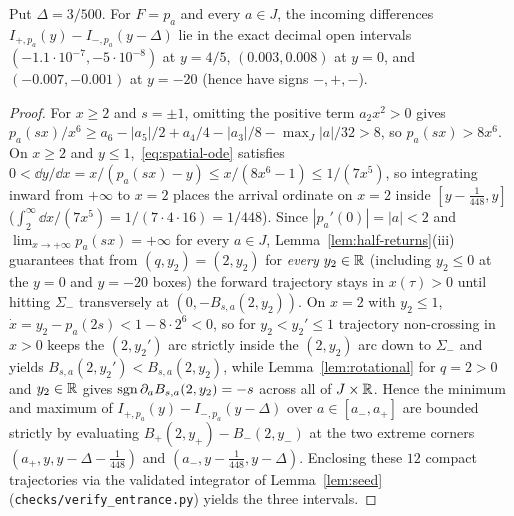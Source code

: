 \begin{lemma}\label{lem:seed-incoming}
Put $\Delta=3/500$. For $F=p_a$ and every $a\in J$, the incoming differences $I_{+,p_a}(y)-I_{-,p_a}(y-\Delta)$ lie in the exact decimal open intervals $(-1.1\cdot 10^{-7},-5\cdot 10^{-8})$ at $y=4/5$, $(0.003,0.008)$ at $y=0$, and $(-0.007,-0.001)$ at $y=-20$ (hence have signs $-,+,-$).
\end{lemma}

\begin{proof}
For $x\ge 2$ and $s=\pm 1$, omitting the positive term $a_2 x^2>0$ gives $p_a(sx)/x^6\ge a_6-|a_5|/2+a_4/4-|a_3|/8-\max_J|a|/32>8$, so $p_a(sx)>8x^6$. On $x\ge 2$ and $y\le 1$,~\eqref{eq:spatial-ode} satisfies $0<\dd y/\dd x=x/(p_a(sx)-y)\le x/(8x^6-1)\le 1/(7x^5)$, so integrating inward from $+\infty$ to $x=2$ places the arrival ordinate on $x=2$ inside $[y-\frac{1}{448},y]$ ($\int_2^\infty\dd x/(7x^5)=1/(7\cdot 4\cdot 16)=1/448$). Since $|p_a'(0)|=|a|<2$ and $\lim_{x\to+\infty}p_a(sx)=+\infty$ for every $a\in J$, Lemma~\ref{lem:half-returns}(iii) guarantees that from $(q,y_2)=(2,y_2)$ for \emph{every} $y_2\in\mathbb{R}$ (including $y_2\le 0$ at the $y=0$ and $y=-20$ boxes) the forward trajectory stays in $x(\tau)>0$ until hitting $\Sigma_-$ transversely at $(0,-B_{s,a}(2,y_2))$. On $x=2$ with $y_2\le 1$, $\dot x=y_2-p_a(2s)<1-8\cdot 2^6<0$, so for $y_2<y_2'\le 1$ trajectory non-crossing in $x>0$ keeps the $(2,y_2')$ arc strictly inside the $(2,y_2)$ arc down to $\Sigma_-$ and yields $B_{s,a}(2,y_2')<B_{s,a}(2,y_2)$, while Lemma~\ref{lem:rotational} for $q=2>0$ and $y_2\in\mathbb{R}$ gives $\operatorname{sgn}\partial_a B_{s,a}(2,y_2)=-s$ across all of $J\times\mathbb{R}$. Hence the minimum and maximum of $I_{+,p_a}(y)-I_{-,p_a}(y-\Delta)$ over $a\in[a_-,a_+]$ are bounded strictly by evaluating $B_+(2,y_+)-B_-(2,y_-)$ at the two extreme corners $(a_+,y,y-\Delta-\frac{1}{448})$ and $(a_-,y-\frac{1}{448},y-\Delta)$. Enclosing these $12$ compact trajectories via the validated integrator of Lemma~\ref{lem:seed} (\texttt{checks/verify\_entrance.py}) yields the three intervals.
\end{proof}

